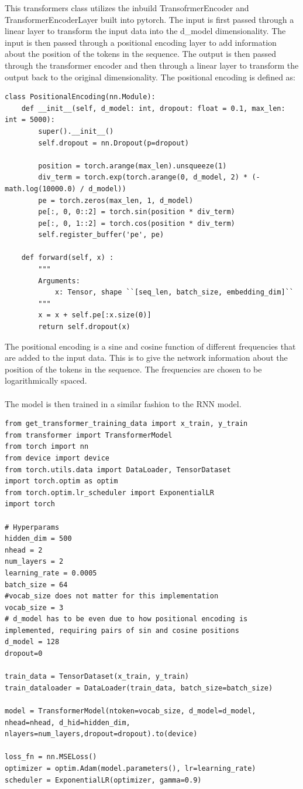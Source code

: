 \documentclass[11pt]{article}
\begin{document}
This transformers class utilizes the inbuild TransofrmerEncoder and TransformerEncoderLayer built into pytorch. The input is first passed through a linear layer to transform the input data into the d\_model dimensionality. The input is then passed through a positional encoding layer to add information about the position of the tokens in the sequence. The output is then passed through the transformer encoder and then through a linear layer to transform the output back to the original dimensionality. The positional encoding is defined as:

\begin{lstlisting}
class PositionalEncoding(nn.Module):
    def __init__(self, d_model: int, dropout: float = 0.1, max_len: int = 5000):
        super().__init__()
        self.dropout = nn.Dropout(p=dropout)

        position = torch.arange(max_len).unsqueeze(1)
        div_term = torch.exp(torch.arange(0, d_model, 2) * (-math.log(10000.0) / d_model))
        pe = torch.zeros(max_len, 1, d_model)
        pe[:, 0, 0::2] = torch.sin(position * div_term)
        pe[:, 0, 1::2] = torch.cos(position * div_term)
        self.register_buffer('pe', pe)

    def forward(self, x) :
        """
        Arguments:
            x: Tensor, shape ``[seq_len, batch_size, embedding_dim]``
        """
        x = x + self.pe[:x.size(0)]
        return self.dropout(x)
\end{lstlisting}

The positional encoding is a sine and cosine function of different frequencies that are added to the input data. This is to give the network information about the position of the tokens in the sequence. The frequencies are chosen to be logarithmically spaced. \\ \\ The model is then trained in a similar fashion to the RNN model.

\begin{lstlisting}
from get_transformer_training_data import x_train, y_train
from transformer import TransformerModel
from torch import nn
from device import device
from torch.utils.data import DataLoader, TensorDataset
import torch.optim as optim
from torch.optim.lr_scheduler import ExponentialLR
import torch

# Hyperparams
hidden_dim = 500
nhead = 2
num_layers = 2
learning_rate = 0.0005
batch_size = 64
#vocab_size does not matter for this implementation
vocab_size = 3
# d_model has to be even due to how positional encoding is implemented, requiring pairs of sin and cosine positions
d_model = 128
dropout=0

train_data = TensorDataset(x_train, y_train)
train_dataloader = DataLoader(train_data, batch_size=batch_size)

model = TransformerModel(ntoken=vocab_size, d_model=d_model, nhead=nhead, d_hid=hidden_dim, nlayers=num_layers,dropout=dropout).to(device)

loss_fn = nn.MSELoss()
optimizer = optim.Adam(model.parameters(), lr=learning_rate)
scheduler = ExponentialLR(optimizer, gamma=0.9)
\end{lstlisting}
\end{document}
